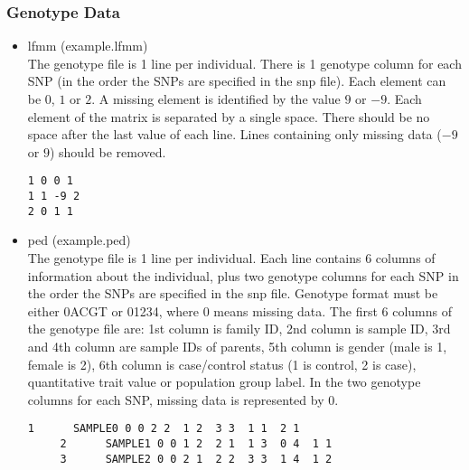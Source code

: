 \documentclass[10pt,a4paper]{article}
\begin{document}
\subsubsection{Genotype Data}
\begin{itemize}
\item lfmm (example.lfmm)\\
The genotype file is 1 line per individual.
There is 1 genotype column for each SNP (in the order the SNPs are specified in the snp file).
Each element can be $0$, $1$ or $2$. A missing
element is identified by the value $9$ or $-9$. Each element of the matrix is 
separated by a single space.
There should be no space after the last value of each line.
Lines containing only missing data ($-9$ or $9$) should be removed.

\begin{center}
\footnotesize
\begin{Verbatim}[frame=single]
1 0 0 1
1 1 -9 2
2 0 1 1
\end{Verbatim}
\end{center}
\item ped (example.ped) \\
The genotype file is 1 line per individual.  Each line contains 6 columns
  of information about the individual, plus two genotype columns for
  each SNP in the order the SNPs are specified in the snp file.
  Genotype format must be either 0ACGT or 01234, where 0 means missing data.
  The first 6 columns of the genotype file are:
    1st column is family ID,
    2nd column is sample ID,
    3rd and 4th column are sample IDs of parents,
    5th column is gender (male is 1, female is 2),
    6th column is case/control status (1 is control, 2 is case),
      quantitative trait value or population group label.
  In the two genotype columns for each SNP, missing data is represented by 0.
\begin{center}
\footnotesize
\begin{Verbatim}[frame=single]
     1      SAMPLE0 0 0 2 2  1 2  3 3  1 1  2 1
     2      SAMPLE1 0 0 1 2  2 1  1 3  0 4  1 1
     3      SAMPLE2 0 0 2 1  2 2  3 3  1 4  1 2
\end{Verbatim}
\end{center}


\end{itemize}
\end{document}
